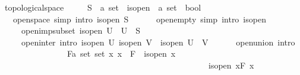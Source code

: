 \documentclass[12pt]{scrartcl}
\begin{document}
\begin{isabelle}
\isamarkupfalse%
\ topological{\isacharunderscore}{\kern0pt}space\ {\isacharequal}{\kern0pt}\ \isanewline
\ \ \ S\ {\isacharcolon}{\kern0pt}{\isacharcolon}{\kern0pt}\ {\isachardoublequoteopen}{\isacharprime}{\kern0pt}a\ set{\isachardoublequoteclose}\ \ is{\isacharunderscore}{\kern0pt}open\ {\isacharcolon}{\kern0pt}{\isacharcolon}{\kern0pt}\ {\isachardoublequoteopen}{\isacharprime}{\kern0pt}a\ set\ {\isasymRightarrow}\ bool{\isachardoublequoteclose}\isanewline
\ \ \ open{\isacharunderscore}{\kern0pt}space\ {\isacharbrackleft}{\kern0pt}simp{\isacharcomma}{\kern0pt}\ intro{\isacharbrackright}{\kern0pt}{\isacharcolon}{\kern0pt}\ {\isachardoublequoteopen}is{\isacharunderscore}{\kern0pt}open\ S{\isachardoublequoteclose}\ \isanewline
\ \ \ \ \ open{\isacharunderscore}{\kern0pt}empty\ {\isacharbrackleft}{\kern0pt}simp{\isacharcomma}{\kern0pt}\ intro{\isacharbrackright}{\kern0pt}{\isacharcolon}{\kern0pt}\ {\isachardoublequoteopen}is{\isacharunderscore}{\kern0pt}open\ {\isacharbraceleft}{\kern0pt}{\isacharbraceright}{\kern0pt}{\isachardoublequoteclose}\ \isanewline
\ \ \ \ \ open{\isacharunderscore}{\kern0pt}imp{\isacharunderscore}{\kern0pt}subset{\isacharcolon}{\kern0pt}\ {\isachardoublequoteopen}is{\isacharunderscore}{\kern0pt}open\ U\ {\isasymLongrightarrow}\ U\ {\isasymsubseteq}\ S{\isachardoublequoteclose}\isanewline
\ \ \ \ \ open{\isacharunderscore}{\kern0pt}inter\ {\isacharbrackleft}{\kern0pt}intro{\isacharbrackright}{\kern0pt}{\isacharcolon}{\kern0pt}\ {\isachardoublequoteopen}{\isasymlbrakk}is{\isacharunderscore}{\kern0pt}open\ U{\isacharsemicolon}{\kern0pt}\ is{\isacharunderscore}{\kern0pt}open\ V{\isasymrbrakk}\ {\isasymLongrightarrow}\ is{\isacharunderscore}{\kern0pt}open\ {\isacharparenleft}{\kern0pt}U\ {\isasyminter}\ V{\isacharparenright}{\kern0pt}{\isachardoublequoteclose}\ \isanewline
\ \ \ \ \ open{\isacharunderscore}{\kern0pt}union\ {\isacharbrackleft}{\kern0pt}intro{\isacharbrackright}{\kern0pt}{\isacharcolon}{\kern0pt}\ \isanewline
\ \ \ \ \ \ \ \ \ \ \ \ \ \ \ \ {\isachardoublequoteopen}{\isasymAnd}F{\isacharcolon}{\kern0pt}{\isacharcolon}{\kern0pt}{\isacharparenleft}{\kern0pt}{\isacharprime}{\kern0pt}a\ set{\isacharparenright}{\kern0pt}\ set{\isachardot}{\kern0pt}\ {\isacharparenleft}{\kern0pt}{\isasymAnd}x{\isachardot}{\kern0pt}\ x\ {\isasymin}\ F\ {\isasymLongrightarrow}\ is{\isacharunderscore}{\kern0pt}open\ x{\isacharparenright}{\kern0pt}\isanewline
\ \ \ \ \ \ \ \ \ \ \ \ \ \ \ \ \ \ \ \ \ \ \ \ \ \ \ \ \ \ \ \ \ \ \ \ \ \ \ \ \ \ \ \ \ \ \ \ \ {\isasymLongrightarrow}\ is{\isacharunderscore}{\kern0pt}open\ {\isacharparenleft}{\kern0pt}{\isasymUnion}x{\isasymin}F{\isachardot}{\kern0pt}\ x{\isacharparenright}{\kern0pt}{\isachardoublequoteclose}
\end{isabelle}
\end{document}
